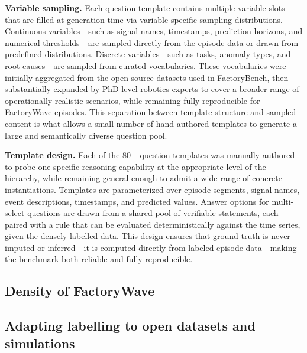 \documentclass{article}
\begin{document}

\textbf{Variable sampling.} Each question template contains multiple variable slots that are filled at generation time via variable-specific sampling distributions. Continuous variables---such as signal names, timestamps, prediction horizons, and numerical thresholds---are sampled directly from the episode data or drawn from predefined distributions. Discrete variables---such as tasks, anomaly types, and root causes---are sampled from curated vocabularies. These vocabularies were initially aggregated from the open-source datasets used in FactoryBench, then substantially expanded by PhD-level robotics experts to cover a broader range of operationally realistic scenarios, while remaining fully reproducible for FactoryWave episodes. This separation between template structure and sampled content is what allows a small number of hand-authored templates to generate a large and semantically diverse question pool.

\textbf{Template design.} Each of the 80+ question templates was manually authored to probe one specific reasoning capability at the appropriate level of the hierarchy, while remaining general enough to admit a wide range of concrete instantiations. Templates are parameterized over episode segments, signal names, event descriptions, timestamps, and predicted values. Answer options for multi-select questions are drawn from a shared pool of verifiable statements, each paired with a rule that can be evaluated deterministically against the time series, given the densely labelled data. This design ensures that ground truth is never imputed or inferred---it is computed directly from labeled episode data---making the benchmark both reliable and fully reproducible.

\subsection{Density of FactoryWave}


\subsection{Adapting labelling to open datasets and simulations}
\end{document}
